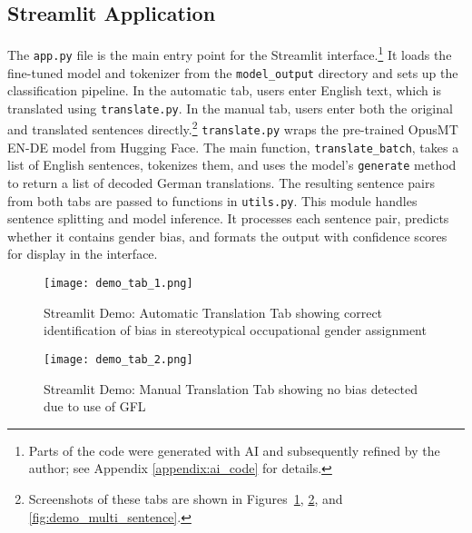     \subsection{Streamlit Application}
        The \texttt{app.py} file is the main entry point for the Streamlit interface.\footnote{Parts of the code were generated with AI and subsequently refined by the author; see Appendix \ref{appendix:ai_code} for details.}
        It loads the fine-tuned model and tokenizer from the \texttt{model\_output} directory and sets up the classification pipeline. In the automatic tab, users enter English text, which is translated using \texttt{translate.py}. In the manual tab, users enter both the original and translated sentences directly.\footnote{Screenshots of these tabs are shown in Figures~\ref{fig:demo_tab_1}, \ref{fig:demo_tab_2}, and \ref{fig:demo_multi_sentence}.} \texttt{translate.py} wraps the pre-trained OpusMT EN-DE model from Hugging Face. The main function, \texttt{translate\_batch}, takes a list of English sentences, tokenizes them, and uses the model's \texttt{generate} method to return a list of decoded German translations. The resulting sentence pairs from both tabs are passed to functions in \texttt{utils.py}. This module handles sentence splitting and model inference. It processes each sentence pair, predicts whether it contains gender bias, and formats the output with confidence scores for display in the interface.

        \vspace{0.8em}
        \begin{figure}[H]
            \centering
            \texttt{[image: demo\_tab\_1.png]}
            \caption[Streamlit Demo: Automatic Translation Tab]{Streamlit Demo: Automatic Translation Tab showing correct identification of bias in stereotypical occupational gender assignment}
            \label{fig:demo_tab_1}
        \end{figure}
        \vspace{0.8em}

        \begin{figure}[H]
            \centering
            \texttt{[image: demo\_tab\_2.png]}
            \caption[Streamlit Demo: Manual Translation Tab]{Streamlit Demo: Manual Translation Tab showing no bias detected due to use of GFL}
            \label{fig:demo_tab_2}
        \end{figure}
        \vspace{0.8em}


